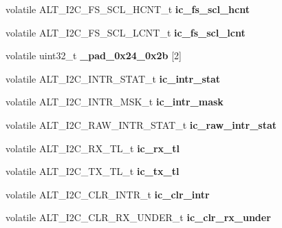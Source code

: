 \begin{DoxyCompactItemize}
volatile A\+L\+T\+\_\+\+I2\+C\+\_\+\+F\+S\+\_\+\+S\+C\+L\+\_\+\+H\+C\+N\+T\+\_\+t {\bfseries ic\+\_\+fs\+\_\+scl\+\_\+hcnt}
\item 
\mbox{\label{structALT__I2C__s_acf12ef31015beb20d22eb85b2d99bae8}} 
volatile A\+L\+T\+\_\+\+I2\+C\+\_\+\+F\+S\+\_\+\+S\+C\+L\+\_\+\+L\+C\+N\+T\+\_\+t {\bfseries ic\+\_\+fs\+\_\+scl\+\_\+lcnt}
\item 
\mbox{\label{structALT__I2C__s_a04f041fc2ca2f6c961d12fe3a95199e8}} 
volatile uint32\+\_\+t {\bfseries \+\_\+pad\+\_\+0x24\+\_\+0x2b} \mbox{[}2\mbox{]}
\item 
\mbox{\label{structALT__I2C__s_ab0d0cfc36aef486cf2a3a61f9cb22c19}} 
volatile A\+L\+T\+\_\+\+I2\+C\+\_\+\+I\+N\+T\+R\+\_\+\+S\+T\+A\+T\+\_\+t {\bfseries ic\+\_\+intr\+\_\+stat}
\item 
\mbox{\label{structALT__I2C__s_a50d1897b8db5d67f0c780da011a4fd8b}} 
volatile A\+L\+T\+\_\+\+I2\+C\+\_\+\+I\+N\+T\+R\+\_\+\+M\+S\+K\+\_\+t {\bfseries ic\+\_\+intr\+\_\+mask}
\item 
\mbox{\label{structALT__I2C__s_a27e846faa72f7f22c6566722b666bfc7}} 
volatile A\+L\+T\+\_\+\+I2\+C\+\_\+\+R\+A\+W\+\_\+\+I\+N\+T\+R\+\_\+\+S\+T\+A\+T\+\_\+t {\bfseries ic\+\_\+raw\+\_\+intr\+\_\+stat}
\item 
\mbox{\label{structALT__I2C__s_aea2c9eb0d2064f7aab624fe490d676b3}} 
volatile A\+L\+T\+\_\+\+I2\+C\+\_\+\+R\+X\+\_\+\+T\+L\+\_\+t {\bfseries ic\+\_\+rx\+\_\+tl}
\item 
\mbox{\label{structALT__I2C__s_a8a0eff0ab259f56cf8556939eb6400b3}} 
volatile A\+L\+T\+\_\+\+I2\+C\+\_\+\+T\+X\+\_\+\+T\+L\+\_\+t {\bfseries ic\+\_\+tx\+\_\+tl}
\item 
\mbox{\label{structALT__I2C__s_ae0a64428b41b80228fe35af3b1ae3414}} 
volatile A\+L\+T\+\_\+\+I2\+C\+\_\+\+C\+L\+R\+\_\+\+I\+N\+T\+R\+\_\+t {\bfseries ic\+\_\+clr\+\_\+intr}
\item 
\mbox{\label{structALT__I2C__s_a12ca142ae14ba4835e9445f6b4082c73}} 
volatile A\+L\+T\+\_\+\+I2\+C\+\_\+\+C\+L\+R\+\_\+\+R\+X\+\_\+\+U\+N\+D\+E\+R\+\_\+t {\bfseries ic\+\_\+clr\+\_\+rx\+\_\+under}

\end{DoxyCompactItemize}
